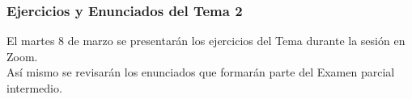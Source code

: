 \documentclass[12pt]{beamer}
\begin{document}
\begin{frame}
\frametitle{Ejercicios y Enunciados del Tema 2}
El martes 8 de marzo se presentarán los ejercicios del Tema durante la sesión en Zoom.
\\
\bigskip
\pause
Así mismo se revisarán los enunciados que formarán parte del Examen parcial intermedio.
\end{frame}
\end{document}
